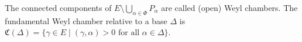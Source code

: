 The connected components of $E \setminus \bigcup_{\alpha \in \Phi} P_\alpha$ are called (open) Weyl chambers. The fundamental Weyl chamber relative to a base $\Delta$ is $\mathfrak{C}(\Delta) = \{\gamma \in E \mid (\gamma, \alpha) > 0 \text{ for all } \alpha \in \Delta\}$.
